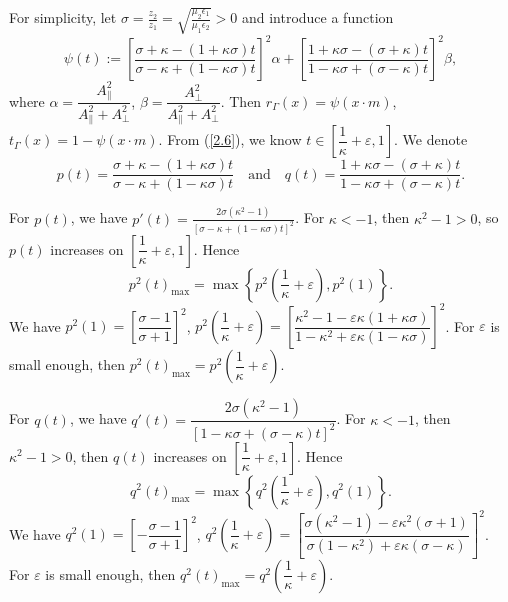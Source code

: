 \documentclass[a4paper,12pt,]{article}
\numberwithin{equation}{section}
\numberwithin{equation}{section} \allowdisplaybreaks
\begin{document}
For simplicity, let $\sigma = \displaystyle \frac{z_{2}}{z_{1}} = \displaystyle \sqrt{\frac{\mu_{2}\epsilon_{1}}{\mu_{1}\epsilon_{2}}} > 0$ and introduce a function
\begin{equation}\label{3.5}
  \psi(t) := \left[\frac{\sigma + \kappa -(1 + \kappa \sigma)t}{\sigma - \kappa + (1 - \kappa \sigma)t}\right]^{2} \alpha + \left[\frac{1 + \kappa \sigma - (\sigma + \kappa)t}{1 - \kappa \sigma + (\sigma - \kappa)t}\right]^{2} \beta,
\end{equation}
where $\alpha = \dfrac{A_{\parallel}^{2}}{A_{\parallel}^{2} + A_{\bot}^{2}}$, $\beta = \dfrac{A_{\bot}^{2}}{A_{\parallel}^{2} + A_{\bot}^{2}}$. Then $r_{\Gamma}(x) = \psi(x \cdot m)$, $t_{\Gamma}(x) = 1- \psi(x \cdot m)$. From (\ref{2.6}), we know $t\in\left[\dfrac{1}{\kappa} + \varepsilon,1\right]$. We denote
$$p(t) = \frac{\sigma + \kappa -(1 + \kappa \sigma)t}{\sigma - \kappa + (1 - \kappa \sigma)t} \quad \text{and} \quad q(t) = \frac{1 + \kappa \sigma - (\sigma + \kappa)t}{1 - \kappa \sigma + (\sigma - \kappa)t}.$$

For $p(t)$, we have $p'(t) = \displaystyle \frac{2 \sigma (\kappa^{2} - 1)}{[\sigma - \kappa + (1 - \kappa \sigma)t]^{2}}$.  For $\kappa <-1$, then $\kappa^{2} - 1 >0$, so $p(t)$ increases on $\left[\dfrac{1}{\kappa} + \varepsilon,1\right]$. Hence 
$$p^{2}(t)_{\max} = \max\left\{p^{2}\left(\dfrac{1}{\kappa} + \varepsilon\right), p^{2}(1)\right\}.$$
We have $p^{2}(1) = \left[\dfrac{\sigma - 1}{\sigma + 1}\right]^{2}$, $p^{2}\left(\dfrac{1}{\kappa} + \varepsilon\right) = \left[\dfrac{\kappa^{2} - 1 - \varepsilon \kappa(1 + \kappa \sigma)}{1 - \kappa^{2} + \varepsilon \kappa(1 - \kappa \sigma)}\right]^{2}$. For $\varepsilon$ is small enough, then $p^{2}(t)_{\max} = p^{2}\left(\dfrac{1}{\kappa} + \varepsilon\right)$.

For $q(t)$, we have $q'(t) = \dfrac{2 \sigma (\kappa^{2} - 1)}{[1 - \kappa \sigma + (\sigma - \kappa)t]^{2}}$. For $\kappa <-1$, then $\kappa^{2} - 1 >0$, then $q(t)$ increases on $\left[\dfrac{1}{\kappa} + \varepsilon,1\right]$. Hence 
$$q^{2}(t)_{\max} = \max\left\{q^{2}\left(\dfrac{1}{\kappa} + \varepsilon\right), q^{2}(1)\right\}.$$
We have $q^{2}(1) = \left[-\dfrac{\sigma - 1}{\sigma + 1}\right]^{2}$, $q^{2}\left(\dfrac{1}{\kappa} + \varepsilon\right) = \left[\dfrac{\sigma (\kappa^{2} - 1) - \varepsilon \kappa^{2}(\sigma + 1)}{\sigma (1 - \kappa^{2}) + \varepsilon \kappa (\sigma - \kappa)}\right]^{2}$. For $\varepsilon$ is small enough, then $q^{2}(t)_{\max} = q^{2}\left(\dfrac{1}{\kappa} + \varepsilon\right)$.
\end{document}
